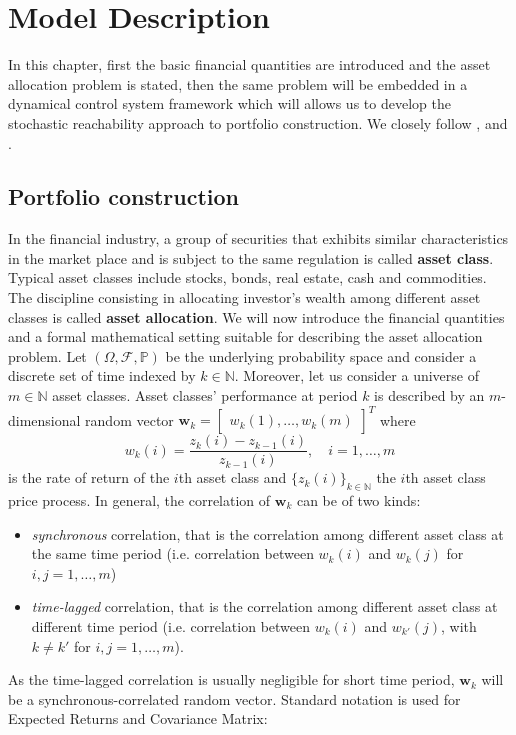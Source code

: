 \chapter{Model Description}\label{chpt:Model_Description}
\glsresetall
In this chapter, first the basic financial quantities are introduced and the asset allocation problem is stated, then the same problem will be embedded in a dynamical control system framework which will allows us to develop the stochastic reachability approach to portfolio construction. We closely follow \cite{Pola12},\cite{Pola06} and \cite{Pola}.
\section{Portfolio construction}
In the financial industry, a group of securities that exhibits similar characteristics in the market place and is subject to the same regulation is called \textbf{asset class}. Typical asset classes include stocks, bonds, real estate, cash and commodities. The discipline consisting in allocating investor's wealth among different asset classes is called \textbf{asset allocation}. We will now introduce the financial quantities and a formal mathematical setting suitable for describing the asset allocation problem. Let $(\Omega,\mathcal{F},\mathbb{P})$ be the underlying  probability space and consider a discrete set of time indexed by $k \in \mathbb{N}$. Moreover, let us consider a universe of $m \in \mathbb{N}$ asset classes. Asset classes' performance at period $k$ is described by an $m$-dimensional random vector 
$\bm{w}_k = \begin{bmatrix} w_k(1),\ldots,w_k(m)\end{bmatrix}^T $ 
where 
$$ w_k(i) = \frac{z_k(i)-z_{k-1}(i)}{z_{k-1}(i)}, \quad i = 1,\ldots,m$$
is the rate of return of the $i$th asset class and $\{z_k(i)\}_{k \in \mathbb{N}}$ the $i$th asset class price process. In general, the correlation of $\bm{w}_k$ can be of two kinds:
\begin{itemize}
	\item \textit{synchronous} correlation, that is the correlation among different asset class at the same time period (i.e. correlation between $w_k(i)$ and $w_k(j)$ for $i,j=1,\ldots,m$)
	\item \textit{time-lagged} correlation, that is the correlation among different asset class at different time period (i.e. correlation between $w_k(i)$ and $w_{k'}(j)$, with $k\neq k'$ for $i,j=1,\ldots,m$).
\end{itemize}
As the time-lagged correlation is usually negligible for short time period, $\bm{w}_k$ will be a synchronous-correlated random vector. Standard notation is used for Expected Returns and Covariance Matrix: 


